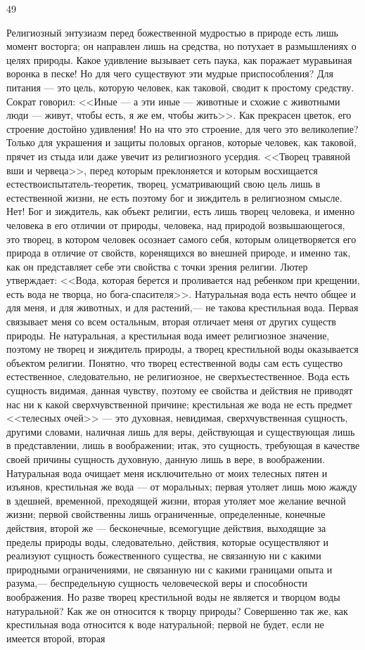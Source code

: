 \documentclass[12pt]{article}
\begin{document}
49

Религиозный энтузиазм перед божественной мудростью в природе есть лишь момент восторга; он направлен лишь на средства, но потухает в размышлениях о целях природы. Какое удивление вызывает сеть паука, как поражает муравьиная воронка в песке! Но для чего существуют эти мудрые приспособления? Для питания --- это цель, которую человек, как таковой, сводит к простому средству. Сократ говорил: <<Иные --- а эти иные --- животные и схожие с животными люди --- живут, чтобы есть, я же ем, чтобы жить>>. Как прекрасен цветок, его строение достойно удивления! Но на что это строение, для чего это великолепие? Только для украшения и защиты половых органов, которые человек, как таковой, прячет из стыда или даже увечит из религиозного усердия. <<Творец травяной вши и червеца>>, перед которым преклоняется и которым восхищается естествоиспытатель-теоретик, творец, усматривающий свою цель лишь в естественной жизни, не есть поэтому бог и зиждитель в религиозном смысле. Нет! Бог и зиждитель, как объект религии, есть лишь творец человека, и именно человека в его отличии от природы, человека, над природой возвышающегося, это творец, в котором человек осознает самого себя, которым олицетворяется его природа в отличие от свойств, коренящихся во внешней природе, и именно так, как он представляет себе эти свойства с точки зрения религии. Лютер утверждает: <<Вода, которая берется и проливается над ребенком при крещении, есть вода не творца, но бога-спасителя>>. Натуральная вода есть нечто общее и для меня, и для животных, и для растений,--- не такова крестильная вода. Первая связывает меня со всем остальным, вторая отличает меня от других существ природы. Не натуральная, а крестильная вода имеет религиозное значение, поэтому не творец и зиждитель природы, а творец крестильной воды оказывается объектом религии. Понятно, что творец естественной воды сам есть существо естественное, следовательно, не религиозное, не сверхъестественное. Вода есть сущность видимая, данная чувству, поэтому ее свойства и действия не приводят нас ни к какой сверхчувственной причине; крестильная же вода не есть предмет <<телесных очей>> --- это духовная, невидимая, сверхчувственная сущность, другими словами, наличная лишь для веры, действующая и существующая лишь в представлении, лишь в воображении; итак, это сущность, требующая в качестве своей причины сущность духовную, данную лишь в вере, в воображении. Натуральная вода очищает меня исключительно от моих телесных пятен и изъянов, крестильная же вода --- от моральных; первая утоляет лишь мою жажду в здешней, временной, преходящей жизни, вторая утоляет мое желание вечной жизни; первой свойственны лишь ограниченные, определенные, конечные действия, второй же --- бесконечные, всемогущие действия, выходящие за пределы природы воды, следовательно, действия, которые осуществляют и реализуют сущность божественного существа, не связанную ни с какими природными ограничениями, не связанную ни с какими границами опыта и разума,--- беспредельную сущность человеческой веры и способности воображения. Но разве творец крестильной воды не является и творцом воды натуральной? Как же он относится к творцу природы? Совершенно так же, как крестильная вода относится к воде натуральной; первой не будет, если не имеется второй, вторая 
\end{document}
